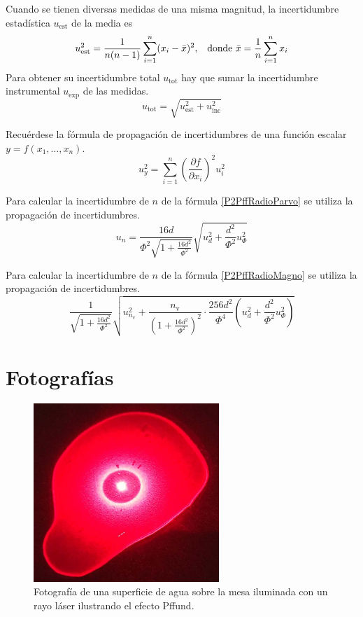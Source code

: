 \documentclass[12pt]{article}
\numberwithin{table}{section}
\numberwithin{figure}{section}
\numberwithin{equation}{section}
\begin{document}
Cuando se tienen diversas medidas de una misma magnitud, la incertidumbre estadística $u_{\text{est}}$ de la media es 
\begin{equation}\label{P2incest}
u_{\text{est}}^2=\frac{1}{n(n-1)}\sum_{i=1}^n(x_i-\bar{x})^2,\hspace{3mm}\text{donde }\bar{x}=\frac{1}{n}\sum_{i=1}^nx_i
\end{equation}
Para obtener su incertidumbre total $u_{\text{tot}}$ hay que sumar la incertidumbre instrumental $u_{\text{exp}}$ de las medidas.
\begin{equation}\label{P2incmedia}
u_{\text{tot}}=\sqrt{u_{\text{est}}^2+u_{\text{inc}}^2}
\end{equation}

Recuérdese la fórmula de propagación de incertidumbres de una función escalar $y=f(x_1,\ldots,x_n)$.
\begin{equation}\label{P2incprop}
u_y^2=\sum_{i=1}^n\left(\frac{\partial f}{\partial x_i}\right)^2u_i^2
\end{equation}

Para calcular la incertidumbre de $n$ de la fórmula \ref{P2PffRadioParvo} se utiliza la propagación de incertidumbres.
\begin{equation}\label{P2incradioparvo}
u_n=\frac{16d}{\Phi^2\sqrt{1+\frac{16d^2}{\Phi^2}}}\sqrt{u_d^2+\frac{d^2}{\Phi^2}u_\Phi^2}
\end{equation}

Para calcular la incertidumbre de $n$ de la fórmula \ref{P2PffRadioMagno} se utiliza la propagación de incertidumbres.
\begin{equation}\label{P2incradiomagno}
\frac{1}{\sqrt{1+\frac{16d^2}{\Phi^2}}}\sqrt{u_{n_\text{v}}^2+\frac{n_\text{v}}{\left(1+\frac{16d^2}{\Phi^2}\right)^2}\cdot\frac{256d^2}{\Phi^4}\left(u_d^2+\frac{d^2}{\Phi^2}u_\Phi^2\right)}
\end{equation}

\newpage
\section{Fotografías}

\begin{figure}[!ht]
	\small \centering \sffamily
	\begin{center}
		\includegraphics[width=7cm]{P2PffAgua.jpeg}
		\caption{Fotografía de una superficie de agua sobre la mesa iluminada con un rayo láser ilustrando el efecto Pffund.}
		\label{P2PffFotoAgua}
	\end{center}
\end{figure}
\end{document}
